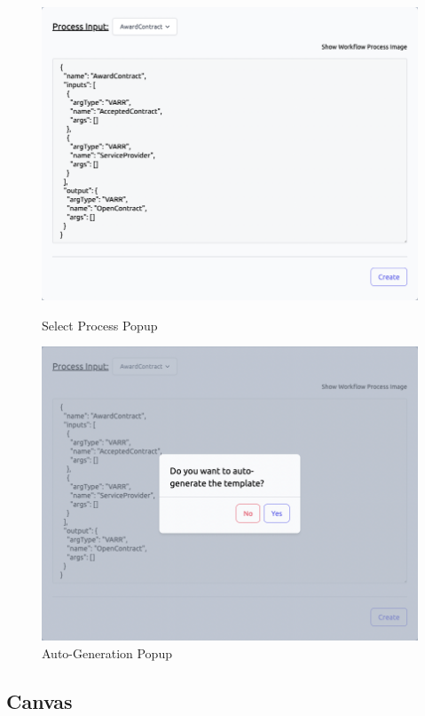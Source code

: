 \begin{figure}[ht!]
\centering
\begin{minipage}{.5\textwidth}
  \centering
  \includegraphics[width=0.9\linewidth]{overleaf/images/screens/process_input.png}
  \caption{Select Process Popup}
  \label{fig:process_input}
\end{minipage}%
\begin{minipage}{.5\textwidth}
  \centering
  \includegraphics[width=0.9\linewidth]{overleaf/images/screens/autogen.png}
  \caption{Auto-Generation Popup}
  \label{fig:autogen}
\end{minipage}
\end{figure}




\subsection{Canvas}
\label{im:canvas}

